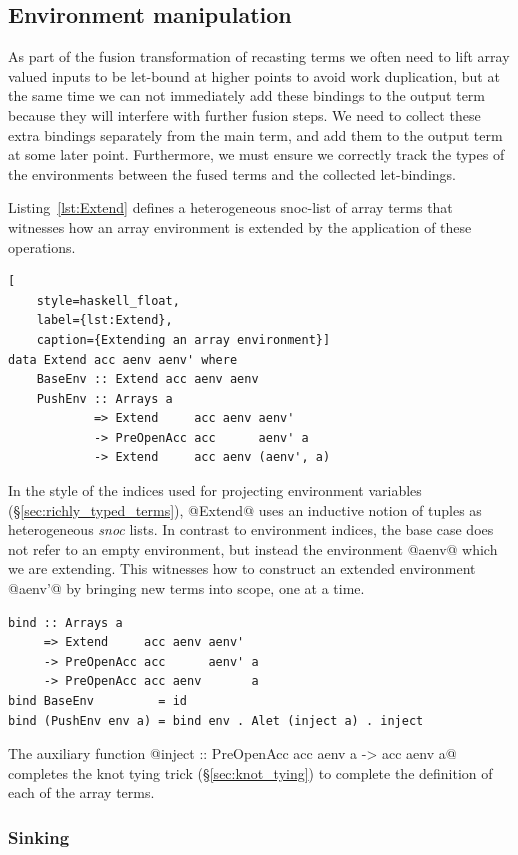 \subsection{Environment manipulation}
\label{sec:environment_manipulation}

As part of the fusion transformation of recasting terms we often need to lift
array valued inputs to be let-bound at higher points to avoid work duplication,
but at the same time we can not immediately add these bindings to the output
term because they will interfere with further fusion steps. We need to collect
these extra bindings separately from the main term, and add them to the output
term at some later point. Furthermore, we must ensure we correctly track the
types of the environments between the fused terms and the collected
let-bindings.

Listing~\ref{lst:Extend} defines a heterogeneous snoc-list of array terms that
witnesses how an array environment is extended by the application of these
operations.
%
\begin{lstlisting}[
    style=haskell_float,
    label={lst:Extend},
    caption={Extending an array environment}]
data Extend acc aenv aenv' where
    BaseEnv :: Extend acc aenv aenv
    PushEnv :: Arrays a
            => Extend     acc aenv aenv'
            -> PreOpenAcc acc      aenv' a
            -> Extend     acc aenv (aenv', a)
\end{lstlisting}
%
In the style of the  indices used for projecting environment
variables (\S\ref{sec:richly_typed_terms}), @Extend@ uses an inductive notion of
tuples as heterogeneous \emph{snoc} lists. In contrast to environment indices,
the base case does not refer to an empty environment, but instead the
environment @aenv@ which we are extending. This witnesses how to construct an
extended environment @aenv'@ by bringing new terms into scope, one at a time.
%
\begin{lstlisting}[style=haskell]
bind :: Arrays a
     => Extend     acc aenv aenv'
     -> PreOpenAcc acc      aenv' a
     -> PreOpenAcc acc aenv       a
bind BaseEnv         = id
bind (PushEnv env a) = bind env . Alet (inject a) . inject
\end{lstlisting}
%
The auxiliary function @inject :: PreOpenAcc acc aenv a -> acc aenv a@ completes
the knot tying trick (\S\ref{sec:knot_tying}) to complete the definition of each
of the array terms.


\subsubsection{Sinking}
\label{sec:sinking}

